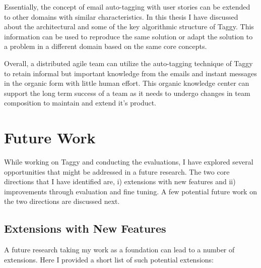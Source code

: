 Essentially, the concept of email auto-tagging with user stories can be extended to other domains with similar characteristics. In this thesis I have discussed about the architectural and some of the key algorithmic structure of Taggy. This information can be used to reproduce the same solution or adapt the solution to a problem in a different domain based on the same core concepts.

Overall, a distributed agile team can utilize the auto-tagging technique of Taggy to retain informal but important knowledge from the emails and instant messages in the organic form with little human effort. This organic knowledge center can support the long term success of a team as it needs to undergo changes in team composition to maintain and extend it's product.

\section{Future Work}
While working on Taggy and conducting the evaluations, I have explored several opportunities that might be addressed in a future research. The two core directions that I have identified are, i) extensions with new features and ii) improvements through evaluation and fine tuning. A few potential future work on the two directions are discussed next.

\subsection{Extensions with New Features}
A future research taking my work as a foundation can lead to a number of extensions. Here I provided a short list of such potential extensions:

